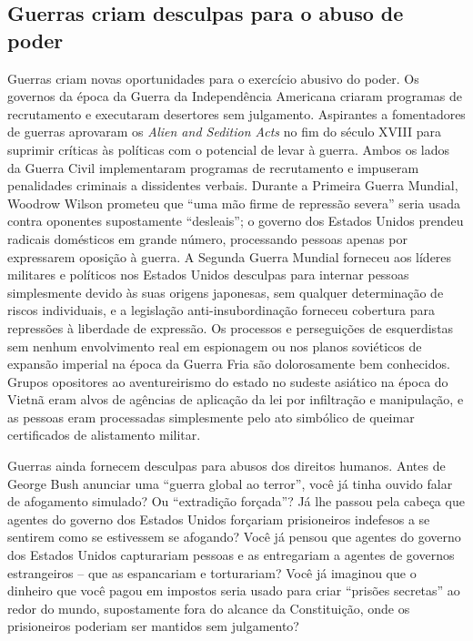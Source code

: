 \subsection*{Guerras criam desculpas para o abuso de poder}

Guerras criam novas oportunidades para o exercício abusivo do poder. Os governos da época da Guerra da Independência Americana criaram programas de recrutamento e executaram desertores sem julgamento. Aspirantes a fomentadores de guerras aprovaram os \emph{Alien and Sedition Acts} no fim do século XVIII para suprimir críticas às políticas com o potencial de levar à guerra. Ambos os lados da Guerra Civil implementaram programas de recrutamento e impuseram penalidades criminais a dissidentes verbais. Durante a Primeira Guerra Mundial, Woodrow Wilson prometeu que ``uma mão firme de repressão severa'' seria usada contra oponentes supostamente ``desleais''; o governo dos Estados Unidos prendeu radicais domésticos em grande número, processando pessoas apenas por expressarem oposição à guerra. A Segunda Guerra Mundial forneceu aos líderes militares e políticos nos Estados Unidos desculpas para internar pessoas simplesmente devido às suas origens japonesas, sem qualquer determinação de riscos individuais, e a legislação anti-insubordinação forneceu cobertura para repressões à liberdade de expressão. Os processos e perseguições de esquerdistas sem nenhum envolvimento real em espionagem ou nos planos soviéticos de expansão imperial na época da Guerra Fria são dolorosamente bem conhecidos. Grupos opositores ao aventureirismo do estado no sudeste asiático na época do Vietnã eram alvos de agências de aplicação da lei por infiltração e manipulação, e as pessoas eram processadas simplesmente pelo ato simbólico de queimar certificados de alistamento militar.

Guerras ainda fornecem desculpas para abusos dos direitos humanos. Antes de George Bush anunciar uma ``guerra global ao terror'', você já tinha ouvido falar de afogamento simulado? Ou ``extradição forçada''? Já lhe passou pela cabeça que agentes do governo dos Estados Unidos forçariam prisioneiros indefesos a se sentirem como se estivessem se afogando? Você já pensou que agentes do governo dos Estados Unidos capturariam pessoas e as entregariam a agentes de governos estrangeiros -- que as espancariam e torturariam? Você já imaginou que o dinheiro que você pagou em impostos seria usado para criar ``prisões secretas'' ao redor do mundo, supostamente fora do alcance da Constituição, onde os prisioneiros poderiam ser mantidos sem julgamento?

